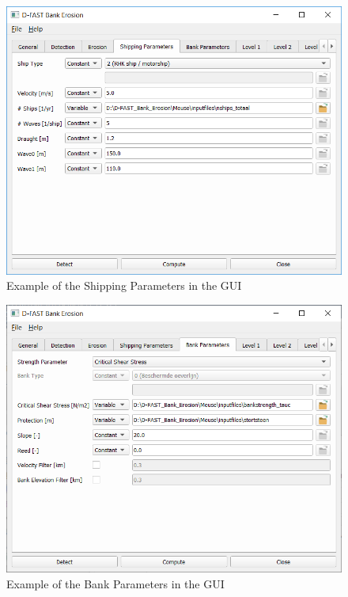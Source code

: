 \begin{figure}
\center
\includegraphics[width=\textwidth]{figures/gui4.png}
\caption{Example of the Shipping Parameters in the GUI}
\label{guiShip}
\end{figure}

\begin{figure}
\center
\includegraphics[width=\textwidth]{figures/gui5.png}
\caption{Example of the Bank Parameters in the GUI}
\label{guiBank}
\end{figure}

